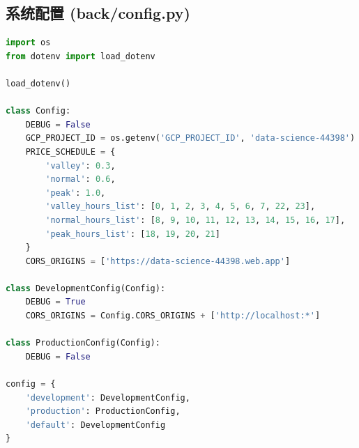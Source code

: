 \subsection{系统配置 (back/config.py)}
\begin{lstlisting}[style=codestyle, language=Python, caption={后端配置定义}]
import os
from dotenv import load_dotenv

load_dotenv()

class Config:
    DEBUG = False
    GCP_PROJECT_ID = os.getenv('GCP_PROJECT_ID', 'data-science-44398')
    PRICE_SCHEDULE = {
        'valley': 0.3,
        'normal': 0.6,
        'peak': 1.0,
        'valley_hours_list': [0, 1, 2, 3, 4, 5, 6, 7, 22, 23],
        'normal_hours_list': [8, 9, 10, 11, 12, 13, 14, 15, 16, 17],
        'peak_hours_list': [18, 19, 20, 21]
    }
    CORS_ORIGINS = ['https://data-science-44398.web.app']

class DevelopmentConfig(Config):
    DEBUG = True
    CORS_ORIGINS = Config.CORS_ORIGINS + ['http://localhost:*']

class ProductionConfig(Config):
    DEBUG = False

config = {
    'development': DevelopmentConfig,
    'production': ProductionConfig,
    'default': DevelopmentConfig
}
\end{lstlisting}

